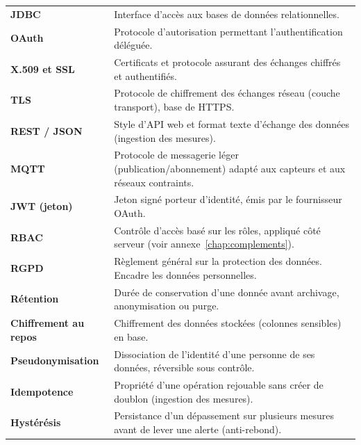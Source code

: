 \begin{xltabular}{\textwidth}{>{\bfseries}p{4cm} X}
JDBC & Interface d'accès aux bases de données relationnelles. \\
OAuth & Protocole d'autorisation permettant l'authentification déléguée. \\
X.509 et SSL & Certificats et protocole assurant des échanges chiffrés et authentifiés. \\
TLS & Protocole de chiffrement des échanges réseau (couche transport), base de HTTPS. \\
REST / JSON & Style d'API web et format texte d'échange des données (ingestion des mesures). \\
MQTT & Protocole de messagerie léger (publication/abonnement) adapté aux capteurs et aux réseaux contraints. \\
JWT (jeton) & Jeton signé porteur d'identité, émis par le fournisseur OAuth. \\
RBAC & Contrôle d'accès basé sur les rôles, appliqué côté serveur (voir annexe~\ref{chap:complements}). \\
RGPD & Règlement général sur la protection des données. Encadre les données personnelles. \\
Rétention & Durée de conservation d'une donnée avant archivage, anonymisation ou purge. \\
Chiffrement au repos & Chiffrement des données stockées (colonnes sensibles) en base. \\
Pseudonymisation & Dissociation de l'identité d'une personne de ses données, réversible sous contrôle. \\
Idempotence & Propriété d'une opération rejouable sans créer de doublon (ingestion des mesures). \\
Hystérésis & Persistance d'un dépassement sur plusieurs mesures avant de lever une alerte (anti-rebond). \\
\bottomrule
\end{xltabular}

